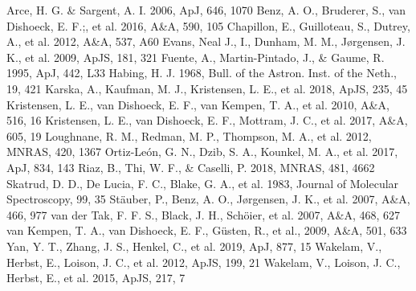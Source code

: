 \documentclass[a4paper]{article}
\renewenvironment{thebibliography}[1]{\begin{oldthebibliography}{#1}\setlength{\parskip}{0ex}\setlength{\itemsep}{0ex}}{\end{oldthebibliography}}
\begin{document}
\begin{thebibliography}{19}
{\small
{} Arce, H. G. \& Sargent, A. I. 2006, ApJ, 646, 1070
 Benz, A. O., Bruderer, S., van Dishoeck, E. F.;, et al. 2016, A\&A, 590, 105
 Chapillon, E., Guilloteau, S., Dutrey, A., et al. 2012, A\&A, 537, A60
 Evans, Neal J., I., Dunham, M. M., Jørgensen, J. K., et al. 2009, ApJS, 181, 321
 Fuente, A., Martin-Pintado, J., \& Gaume, R. 1995, ApJ, 442, L33
 Habing, H. J. 1968, Bull. of the Astron. Inst. of the Neth., 19, 421
 Karska, A., Kaufman, M. J., Kristensen, L. E., et al. 2018, ApJS, 235, 45
 Kristensen, L. E., van Dishoeck, E. F., van Kempen, T. A., et al. 2010, A\&A, 516, 16
 Kristensen, L. E., van Dishoeck, E. F., Mottram, J. C., et al. 2017, A\&A, 605, 19
 Loughnane, R. M., Redman, M. P., Thompson, M. A., et al. 2012, MNRAS, 420, 1367
 Ortiz-León, G. N., Dzib, S. A., Kounkel, M. A., et al. 2017, ApJ, 834, 143
 Riaz, B., Thi, W. F., \& Caselli, P. 2018, MNRAS, 481, 4662
 Skatrud, D. D., De Lucia, F. C., Blake, G. A., et al. 1983, Journal of Molecular Spectroscopy, 99, 35
 Stäuber, P., Benz, A. O., Jørgensen, J. K., et al. 2007, A\&A, 466, 977 
 van der Tak, F. F. S., Black, J. H., Schöier, et al. 2007, A\&A, 468, 627
 van Kempen, T. A., van Dishoeck, E. F., Güsten, R., et al., 2009, A\&A, 501, 633
  Yan, Y. T., Zhang, J. S., Henkel, C., et al. 2019, ApJ, 877, 15
 Wakelam, V., Herbst, E., Loison, J. C., et al. 2012, ApJS, 199, 21
 Wakelam, V., Loison, J. C., Herbst, E., et al. 2015, ApJS, 217, 7
}
\end{thebibliography}
\end{document}
